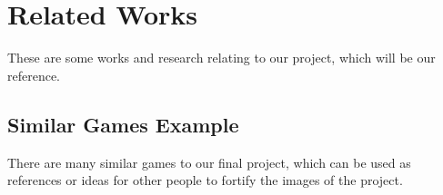 \documentclass[12pt,oneside,openright,a4paper]{cpe-english-project}
\begin{document}
\section{Related Works}
These are some works and research relating to our project, which will be our reference.

\subsection{Similar Games Example}
There are many similar games to our final project, which can be used as references or ideas for other people to fortify the images of the project.
\end{document}
